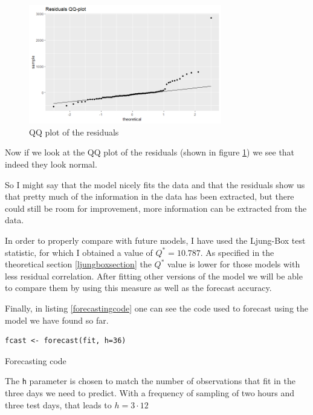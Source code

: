 \documentclass[12pt,a4paper,titlepage]{report}
\begin{document}
\begin{figure}[h]
    \centering
    \includegraphics[width=0.75\textwidth]{dlastweek2hrsph3qq}
    \caption{QQ plot of the residuals}
    \label{dlastweek2hrsph3qq}
\end{figure}

Now if we look at the QQ plot of the residuals (shown in figure \ref{dlastweek2hrsph3qq}) we see that indeed they look normal.

So I might say that the model nicely fits the data and that the residuals show us that pretty much of the information in the data has been extracted, but there could still be room for improvement, more information can be extracted from the data.

In order to properly compare with future models, I have used the Ljung-Box test statistic, for which I obtained a value of $ Q^* = 10.787 $. As specified in the theoretical section \ref{ljungboxsection} the $ Q^* $ value is lower for those models with less residual correlation. After fitting other versions of the model we will be able to compare them by using this measure as well as the forecast accuracy.

Finally, in listing \ref{forecastingcode} one can see the code used to forecast using the model we have found so far.

\begin{listing}[h]
    \begin{verbatim}
fcast <- forecast(fit, h=36)
    \end{verbatim}
    
    \caption{Forecasting code}
    \label{forecastingcode}
\end{listing}

The \texttt{h} parameter is chosen to match the number of observations that fit in the three days we need to predict. With a frequency of sampling of two hours and three test days, that leads to $ h = 3 \cdot 12$
\end{document}
